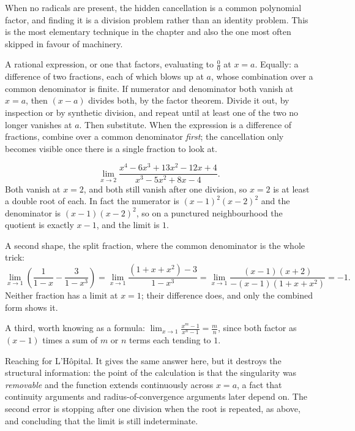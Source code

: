 When no radicals are present, the hidden cancellation is a common polynomial factor, and finding it is a division problem rather than an identity problem. This is the most elementary technique in the chapter and also the one most often skipped in favour of machinery.

\cue A rational expression, or one that factors, evaluating to $\tfrac00$ at $x=a$. Equally: a difference of two fractions, each of which blows up at $a$, whose combination over a common denominator is finite.
\method If numerator and denominator both vanish at $x=a$, then $(x-a)$ divides both, by the factor theorem. Divide it out, by inspection or by synthetic division, and repeat until at least one of the two no longer vanishes at $a$. Then substitute. When the expression is a difference of fractions, combine over a common denominator \emph{first}; the cancellation only becomes visible once there is a single fraction to look at.

\begin{worked}
\[\lim_{x\to2}\frac{x^{4}-6x^{3}+13x^{2}-12x+4}{x^{3}-5x^{2}+8x-4}.\]
Both vanish at $x=2$, and both still vanish after one division, so $x=2$ is at least a double root of each. In fact the numerator is $(x-1)^{2}(x-2)^{2}$ and the denominator is $(x-1)(x-2)^{2}$, so on a punctured neighbourhood the quotient is exactly $x-1$, and the limit is $1$.

A second shape, the split fraction, where the common denominator is the whole trick:
\[\lim_{x\to1}\left(\frac{1}{1-x}-\frac{3}{1-x^{3}}\right)=\lim_{x\to1}\frac{(1+x+x^{2})-3}{1-x^{3}}=\lim_{x\to1}\frac{(x-1)(x+2)}{-(x-1)(1+x+x^{2})}=-1 .\]
Neither fraction has a limit at $x=1$; their difference does, and only the combined form shows it.

A third, worth knowing as a formula: $\displaystyle\lim_{x\to1}\frac{x^{m}-1}{x^{n}-1}=\frac{m}{n}$, since both factor as $(x-1)$ times a sum of $m$ or $n$ terms each tending to $1$.
\end{worked}

\begin{trap}
Reaching for L'H\^opital. It gives the same answer here, but it destroys the structural information: the point of the calculation is that the singularity was \emph{removable} and the function extends continuously across $x=a$, a fact that continuity arguments and radius-of-convergence arguments later depend on. The second error is stopping after one division when the root is repeated, as above, and concluding that the limit is still indeterminate.
\end{trap}

